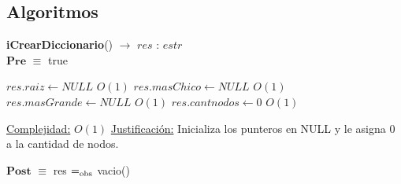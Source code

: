 \subsection{Algoritmos}


\begin{algorithm}[H]{\textbf{iCrearDiccionario}() $\to$ $res$ : $estr$}
	{\\ $\textbf{Pre}$ $\equiv$ true}
	\begin{algorithmic}[1]

		\State $res.raiz \gets NULL$ \Comment $O(1)$
		\State $res.masChico \gets NULL$ \Comment $O(1)$
		\State $res.masGrande \gets NULL$ \Comment $O(1)$
		\State $res.cantnodos \gets 0$ \Comment $O(1)$

		\medskip
		\Statex \underline{Complejidad:} $O(1)$
		\Statex \underline{Justificación:} Inicializa los punteros en NULL y le asigna $0$ a la cantidad de nodos.

    \end{algorithmic}
    {$\textbf{Post}$ $\equiv$ res $=_{\mathrm{obs}}$ vacio()}
\end{algorithm}


